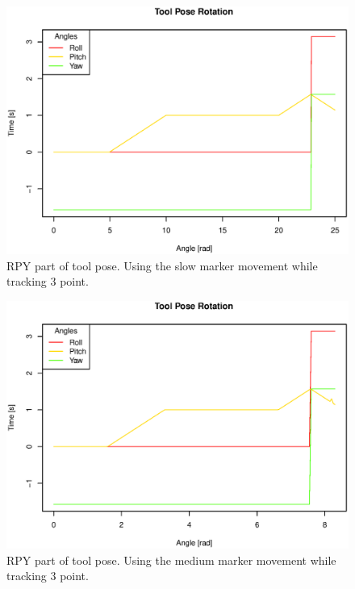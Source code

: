 \begin{figure}[H]
\centering
\includegraphics[width= \fullImageWidth]{graphics/robotics/toolPose_slow_3pt}
\caption{RPY part of tool pose. Using the slow marker movement while tracking 3 point.}
\label{fig:toolpose_slow_3p_rpy}
\end{figure}

\begin{figure}[H]
\centering
\includegraphics[width= \fullImageWidth]{graphics/robotics/toolPose_medium_3pt}
\caption{RPY part of tool pose. Using the medium marker movement while tracking 3 point.}
\label{fig:toolpose_medium_3p_rpy}
\end{figure}

